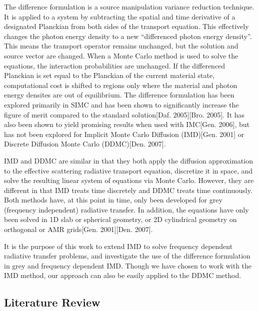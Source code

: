 	The difference formulation is a source manipulation variance reduction technique. It is applied to a system by subtracting the spatial and time derivative of a designated Planckian from both sides of the transport equation. This effectively changes the photon energy density to a new ``differenced photon energy density''. This means the transport operator remains unchanged, but the solution and source vector are changed. When a Monte Carlo method is used to solve the equations, the interaction probabilities are unchanged. If the differenced Planckian is set equal to the Planckian of the current material state, computational cost is shifted to regions only where the material and photon energy densites are out of equilibrium.  The difference formulation has been explored primarily in SIMC and has been shown to significantly increase the figure of merit compared to the standard solution[Daf. 2005][Bro. 2005]. It has also been shown to yield promising results when used with IMC[Gen. 2006], but has not been explored for Implicit Monte Carlo Diffusion (IMD)[Gen. 2001] or Discrete Diffusion Monte Carlo (DDMC)[Den. 2007].

	IMD and DDMC are similar in that they both apply the diffusion approximation to the effective scattering radiative transport equation, discretize it in space, and solve the resulting linear system of equations via Monte Carlo. However, they are different in that IMD treats time discretely and DDMC treats time continuously. Both methods have, at this point in time, only been developed for grey (frequency independent) radiative transfer. In addition, the equations have only been solved in 1D slab or spherical geometry, or 2D cylindrical geometry on orthogonal or AMR grids[Gen. 2001][Den. 2007]. 

	It is the purpose of this work to extend IMD to solve frequency dependent radiative transfer problems, and investigate the use of the difference formulation in grey and frequency dependent IMD. Though we have chosen to work with the IMD method, our approach can also be easily applied to the DDMC method.	

	

\aboveSubSecSkip

\subsection{Literature Review}
\label{sec:Intro-LitRev}
	
